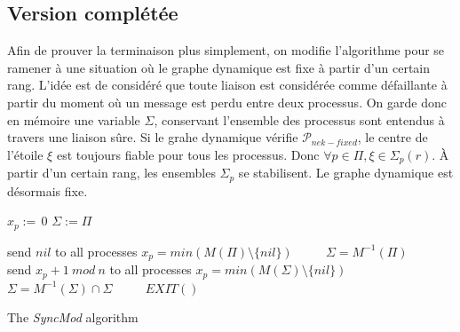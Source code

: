 \documentclass{article}
\begin{document}
\subsection{Version complétée}

Afin de prouver la terminaison plus simplement, on modifie l'algorithme pour se ramener à une situation où le graphe dynamique est fixe à partir d'un certain rang.
L'idée est de considéré que toute liaison est considérée comme défaillante à partir du moment où un message est perdu entre deux processus.
On garde donc en mémoire une variable $\Sigma$, conservant l'ensemble des processus sont entendus à travers une liaison sûre.
Si le grahe dynamique vérifie $\mathcal{P}_{nek-fixed}$, le centre de l'étoile $\xi$ est toujours fiable pour tous les processus. Donc $\forall p \in \Pi, \xi \in \Sigma_p(r)$.
À partir d'un certain rang, les ensembles $\Sigma_p$ se stabilisent. Le graphe dynamique est désormais fixe.

\begin{algorithm}[htb]
\begin{distribalgo}[1]
\BLANK {}
  \STATE $x_p :=\, 0$ 
  \STATE $\Sigma := \Pi$

\ENDINDENT \BLANK

    \STATE send $nil$ to all processes
  \ENDINDENT
  \BLANK
	\STATE $x_p = min(M(\Pi) \setminus \{nil\})$ ~~~~
	\STATE $\Sigma = M^{-1}(\Pi)$ ~~~~
  \ENDINDENT
\ENDINDENT \BLANK
{}
    \STATE send $x_p+1~mod~n$ to all processes
  \ENDINDENT
  \BLANK
	\STATE $x_p = min(M(\Sigma) \setminus \{nil\})$ ~~~~
	\STATE $\Sigma = M^{-1}(\Sigma) \cap \Sigma$ ~~~~
	\STATE $EXIT()$ ~~~~
	\ENDIF
  \ENDINDENT
\ENDINDENT \BLANK


\caption{The {\em SyncMod} algorithm} \label{algo:R}
\end{distribalgo}

\end{algorithm}
\end{document}
